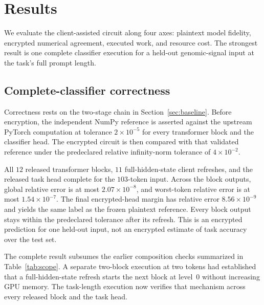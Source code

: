 
\section{Results}
\label{sec:results}

We evaluate the client-assisted circuit along four axes: plaintext model fidelity, encrypted
numerical agreement, executed work, and resource cost. The strongest result is one complete
classifier execution for a held-out genomic-signal input at the task's full prompt length.



\subsection{Complete-classifier correctness}

Correctness rests on the two-stage chain in Section~\ref{sec:baseline}. Before encryption, the
independent NumPy reference is asserted against the upstream PyTorch computation at tolerance
$2\times10^{-5}$ for every transformer block and the classifier head. The encrypted circuit is
then compared with that validated reference under the predeclared relative infinity-norm tolerance
of $4\times10^{-2}$.

All $12$ released transformer blocks, $11$ full-hidden-state client refreshes, and the released
task head complete for the $103$-token input. Across the block outputs, global relative error is at
most $2.07\times10^{-8}$, and worst-token relative error is at most
$1.54\times10^{-7}$. The final encrypted-head margin has relative error
$8.56\times10^{-9}$ and yields the same label as the frozen plaintext reference. Every block output
stays within the predeclared tolerance after its refresh. This is an encrypted prediction for one
held-out input, not an encrypted estimate of task accuracy over the test set.

The complete result subsumes the earlier composition checks summarized in
Table~\ref{tab:scope}. A separate two-block execution at two tokens had established that a
full-hidden-state refresh starts the next block at level~$0$ without increasing GPU memory. The
task-length execution now verifies that mechanism across every released block and the task head.

